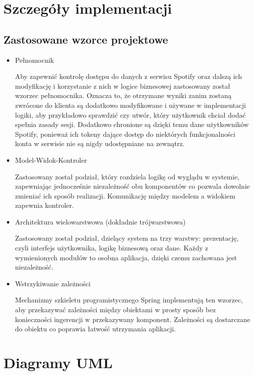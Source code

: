 \section{Szczegóły implementacji}
\subsection{Zastosowane wzorce projektowe}
\begin{itemize}
\item Pełnomocnik

Aby zapewnić kontrolę dostępu do danych z serwisu Spotify oraz dalszą ich modyfikację i korzystanie z nich w logice biznesowej zastosowany został wzorzec pełnomocnika. Oznacza to, że otrzymane wyniki zanim zostaną zwrócone do klienta są dodatkowo modyfikowane i używane w implementacji logiki, aby przykładowo sprawdzić czy utwór, który użytkownik chciał dodać spełnia zasady sesji. Dodatkowo chronione są dzięki temu dane użytkowników Spotify, ponieważ ich tokeny dające dostęp do niektórych funkcjonalności konta w serwisie nie są nigdy udostępniane na zewnątrz.

\item Model-Widok-Kontroler

Zastosowany został podział, który rozdziela logikę od wyglądu w systemie, zapewniając jednocześnie niezależność obu komponentów co pozwala dowolnie zmieniać ich sposób realizacji. Komunikację między modelem a widokiem zapewnia kontroler.

\item Architektura wielowarstwowa (dokładnie trójwarstwowa)

Zastosowany został podział, dzielący system na trzy warstwy: prezentację, czyli interfejs użytkownika, logikę biznesową oraz dane. Każdy z wymienionych modułów to osobna aplikacja, dzięki czemu zachowana jest niezależność.

\item Wstrzykiwanie zależności

Mechanizmy szkieletu programistycznego Spring implementują ten wzorzec, aby przekazywać zależności między obiektami w prosty sposób bez konieczności ingerencji w przekazywany komponent. Zależności są dostarczane do obiektu co poprawia łatwość utrzymania aplikacji.
\end{itemize}
\section{Diagramy UML}

